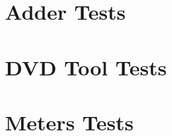 %


\section{Adder Tests}
\label{Samplesaddertests}


\section{DVD Tool Tests}
\label{Samplesdvdtests}


\section{Meters Tests}
\label{SamplesMetersTests}

